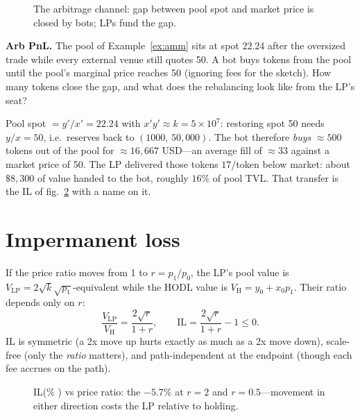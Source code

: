 \begin{figure}[htbp]\centering

\caption{The arbitrage channel: gap between pool spot and market price is closed by bots;
LPs fund the gap.}
\label{fig:ambarb}
\end{figure}

\begin{example}\label{ex:arbpnl}
\textbf{Arb PnL.} The pool of Example~\ref{ex:amm} sits at spot 22.24 after the oversized
trade while every external venue still quotes 50. A bot buys tokens from the pool until the
pool's marginal price reaches 50 (ignoring fees for the sketch). How many tokens close the
gap, and what does the rebalancing look like from the LP's seat?
\begin{solution}
Pool spot $=y'/x'=22.24$ with $x'y'\approx k=5\times10^{7}$: restoring spot 50 needs
$y/x=50$, i.e.\ reserves back to $(1000,\,50{,}000)$. The bot therefore \emph{buys}
$\approx500$ tokens out of the pool for $\approx16{,}667$ USD---an average fill of
$\approx33$ against a market price of 50. The LP delivered those tokens $17$/token below
market: about $\$8{,}300$ of value handed to the bot, roughly $16\%$ of pool TVL. That
transfer is the IL of fig.~\ref{fig:ilcurve} with a name on it.
\end{solution}
\end{example}

\section{Impermanent loss}\label{sec:il}

If the price ratio moves from 1 to $r=p_1/p_0$, the LP's pool value is
$V_{\mathrm{LP}}=2\sqrt{k}\sqrt{p_1}$-equivalent while the HODL value is
$V_{\mathrm{H}}=y_0+x_0p_1$. Their ratio depends only on $r$:
\begin{equation}\label{eq:il}
\frac{V_{\mathrm{LP}}}{V_{\mathrm{H}}}=\frac{2\sqrt{r}}{1+r},
\qquad \mathrm{IL}=\frac{2\sqrt{r}}{1+r}-1\le 0.
\end{equation}
IL is symmetric (a 2x move up hurts exactly as much as a 2x move down), scale-free (only the
\emph{ratio} matters), and path-independent at the endpoint (though each fee accrues on the
path).

\begin{figure}[htbp]\centering

\caption{IL(\% ) vs price ratio: the $-5.7\%$ at $r=2$ and $r=0.5$---movement in either
direction costs the LP relative to holding.}
\label{fig:ilcurve}
\end{figure}

